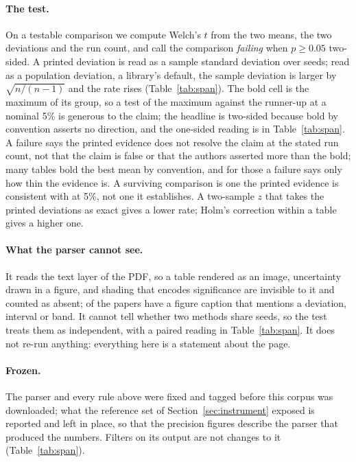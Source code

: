 \documentclass[sigconf,anonymous]{aamas}
\begin{document}
\paragraph{The test.} On a testable comparison we compute Welch's $t$ from the
two means, the two deviations and the run count, and call the comparison
\emph{failing} when $p \geq 0.05$ two-sided. A printed deviation is read
as a sample standard deviation over seeds; read as a population deviation,
a library's default, the sample deviation is larger by $\sqrt{n/(n-1)}$
and the rate rises (Table~\ref{tab:span}). The bold cell is the maximum of
its group, so a test of the maximum against the runner-up at a nominal
5\% is generous to the claim; the headline is two-sided because bold by
convention asserts no direction, and the one-sided reading is in
Table~\ref{tab:span}. A failure says the printed evidence does not resolve
the claim at the stated run count, not that the claim is false or that the
authors asserted more than the bold; many tables bold the best mean by
convention, and for those a failure says only how thin the evidence is. A
surviving comparison is one the printed evidence is consistent with at
5\%, not one it establishes. A two-sample $z$ that takes the printed
deviations as exact gives a lower rate; Holm's correction within a table
gives a higher one.

\paragraph{What the parser cannot see.} It reads the text layer of the PDF,
so a table rendered as an image, uncertainty drawn in a figure, and shading
that encodes significance are invisible to it and counted as absent;
\nFigCaptionUncPapersPct{} of the papers have a figure caption that
mentions a deviation, interval or band. It cannot tell whether two methods
share seeds, so the test treats them as independent, with a paired
reading in Table~\ref{tab:span}. It does not re-run anything: everything
here is a statement about the page.

\paragraph{Frozen.} The parser and every rule above were fixed and tagged
before this corpus was downloaded; what the reference set of
Section~\ref{sec:instrument} exposed is reported and left in place, so
that the precision figures describe the parser that produced the numbers.
Filters on its output are not changes to it (Table~\ref{tab:span}).
\end{document}
